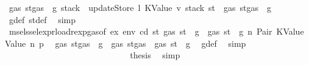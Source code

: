 \begin{isabellebody}
\ {\isachardoublequoteopen}gas\ {\isacharparenleft}{\kern0pt}st{\isacharprime}{\kern0pt}{\isacharprime}{\kern0pt}{\isasymlparr}gas\ {\isacharcolon}{\kern0pt}{\isacharequal}{\kern0pt}\ g{\isacharprime}{\kern0pt}{\isacharprime}{\kern0pt}{\isacharcomma}{\kern0pt}\ stack\ {\isacharcolon}{\kern0pt}{\isacharequal}{\kern0pt}\ updateStore\ l\ {\isacharparenleft}{\kern0pt}KValue\ v{\isacharprime}{\kern0pt}{\isacharparenright}{\kern0pt}\ {\isacharparenleft}{\kern0pt}stack\ st{\isacharparenright}{\kern0pt}{\isasymrparr}{\isacharparenright}{\kern0pt}\ {\isasymle}\ gas\ {\isacharparenleft}{\kern0pt}st{\isacharprime}{\kern0pt}{\isasymlparr}gas\ {\isacharcolon}{\kern0pt}{\isacharequal}{\kern0pt}\ g{\isacharprime}{\kern0pt}{\isasymrparr}{\isacharparenright}{\kern0pt}{\isachardoublequoteclose}\ \isamarkupfalse%
\ g{\isacharunderscore}{\kern0pt}def\ st{\isacharprime}{\kern0pt}{\isacharunderscore}{\kern0pt}def\ \isamarkupfalse%
\ simp\isanewline
\ \ \ \ \ \ \ \ \ \ \ \ \ \ \ \ \ \ \ \ \ \ \ \ \ \ \isamarkupfalse%
\ \isamarkupfalse%
\ msel{\isacharunderscore}{\kern0pt}ssel{\isacharunderscore}{\kern0pt}expr{\isacharunderscore}{\kern0pt}load{\isacharunderscore}{\kern0pt}rexp{\isacharunderscore}{\kern0pt}gas{\isacharparenleft}{\kern0pt}{}{\isacharparenright}{\kern0pt}{\isacharbrackleft}{\kern0pt}of\ ex\ env\ cd\ st{\isacharprime}{\kern0pt}\ {\isachardoublequoteopen}gas\ st\ {\isacharminus}{\kern0pt}\ g{\isachardoublequoteclose}{\isacharbrackright}{\kern0pt}\ {\isacharbackquoteopen}{\isasymnot}\ gas\ st\ {\isasymle}\ g{\isacharbackquoteclose}\ n\ Pair\ KValue\ Value\ n{}\ p{}\ \isamarkupfalse%
\ {\isachardoublequoteopen}gas\ {\isacharparenleft}{\kern0pt}st{\isacharprime}{\kern0pt}{\isasymlparr}gas\ {\isacharcolon}{\kern0pt}{\isacharequal}{\kern0pt}\ g{\isacharprime}{\kern0pt}{\isasymrparr}{\isacharparenright}{\kern0pt}\ {\isasymle}\ gas\ {\isacharparenleft}{\kern0pt}st{\isasymlparr}gas\ {\isacharcolon}{\kern0pt}{\isacharequal}{\kern0pt}\ gas\ st\ {\isacharminus}{\kern0pt}\ g{\isasymrparr}{\isacharparenright}{\kern0pt}{\isachardoublequoteclose}\ \isamarkupfalse%
\ g{\isacharunderscore}{\kern0pt}def\ \isamarkupfalse%
\ simp\isanewline
\ \ \ \ \ \ \ \ \ \ \ \ \ \ \ \ \ \ \ \ \ \ \ \ \ \ \isamarkupfalse%
\ \isamarkupfalse%
\ {\isacharquery}{\kern0pt}thesis\ \isamarkupfalse%
\ simp\isanewline
\ \ \ \ \ \ \ \ \ \ \ \ \ \ \ \ \ \ \ \ \ \ \ \ \isamarkupfalse%
\isanewline

\end{isabellebody}
